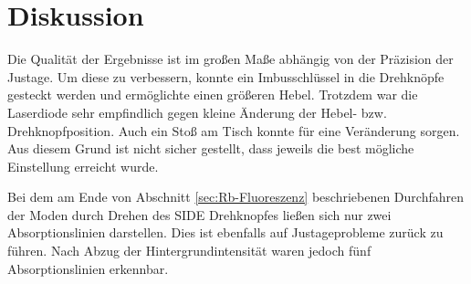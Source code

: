 \section{Diskussion}
\label{sec:Diskussion}

Die Qualität der Ergebnisse ist im großen Maße abhängig von der Präzision
der Justage. Um diese zu verbessern, konnte ein Imbusschlüssel in die
Drehknöpfe gesteckt werden und ermöglichte einen größeren Hebel.
Trotzdem war die Laserdiode sehr empfindlich gegen kleine Änderung der
Hebel- bzw. Drehknopfposition.
Auch ein Stoß am Tisch konnte für eine Veränderung sorgen.
Aus diesem Grund ist nicht sicher gestellt, dass jeweils die best mögliche
Einstellung erreicht wurde.

Bei dem am Ende von Abschnitt \ref{sec:Rb-Fluoreszenz} beschriebenen Durchfahren
der Moden durch Drehen des SIDE Drehknopfes ließen sich nur zwei Absorptionslinien
darstellen. Dies ist ebenfalls auf Justageprobleme zurück zu führen.
Nach Abzug der Hintergrundintensität waren jedoch fünf Absorptionslinien
erkennbar.
